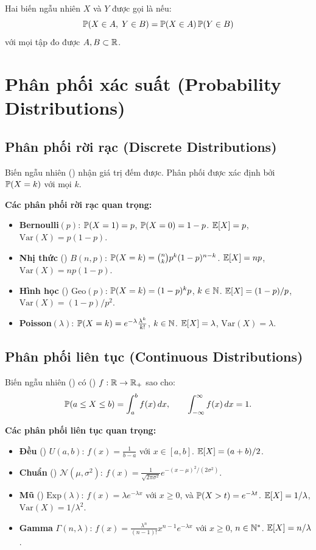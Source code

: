 Hai biến ngẫu nhiên $X$ và $Y$ được gọi là  nếu:
\[
  \mathbb{P}(X \in A,\; Y \in B) = \mathbb{P}(X \in A)\,\mathbb{P}(Y \in B)
\]
với mọi tập đo được $A, B \subset \mathbb{R}$.

\section{Phân phối xác suất (Probability Distributions)}

\subsection{Phân phối rời rạc (Discrete Distributions)}

Biến ngẫu nhiên  () nhận giá trị đếm được.
Phân phối được xác định bởi $\mathbb{P}(X = k)$ với mọi $k$.

\textbf{Các phân phối rời rạc quan trọng:}
\begin{itemize}[nosep]
  \item \textbf{Bernoulli}$(p)$: $\mathbb{P}(X = 1) = p$, $\mathbb{P}(X = 0) = 1-p$. $\mathbb{E}[X] = p$, $\text{Var}(X) = p(1-p)$.
  \item \textbf{Nhị thức} () $B(n,p)$: $\mathbb{P}(X = k) = \binom{n}{k} p^k (1-p)^{n-k}$.
    $\mathbb{E}[X] = np$, $\text{Var}(X) = np(1-p)$.
  \item \textbf{Hình học} () $\text{Geo}(p)$: $\mathbb{P}(X = k) = (1-p)^k p$, $k \in \mathbb{N}$.
    $\mathbb{E}[X] = (1-p)/p$, $\text{Var}(X) = (1-p)/p^2$.
  \item \textbf{Poisson}$(\lambda)$: $\mathbb{P}(X = k) = e^{-\lambda} \frac{\lambda^k}{k!}$, $k \in \mathbb{N}$.
    $\mathbb{E}[X] = \lambda$, $\text{Var}(X) = \lambda$.
\end{itemize}

\subsection{Phân phối liên tục (Continuous Distributions)}

Biến ngẫu nhiên  () có  () $f: \mathbb{R} \to \mathbb{R}_+$ sao cho:
\[
  \mathbb{P}(a \leq X \leq b) = \int_a^b f(x)\,dx, \qquad \int_{-\infty}^{\infty} f(x)\,dx = 1.
\]

\textbf{Các phân phối liên tục quan trọng:}
\begin{itemize}[nosep]
  \item \textbf{Đều} () $U(a,b)$:
    $f(x) = \frac{1}{b-a}$ với $x \in [a,b]$. $\mathbb{E}[X] = (a+b)/2$.
  \item \textbf{Chuẩn} () $\mathcal{N}(\mu, \sigma^2)$:
    $f(x) = \frac{1}{\sqrt{2\pi\sigma^2}} e^{-(x-\mu)^2/(2\sigma^2)}$.
  \item \textbf{Mũ} () $\text{Exp}(\lambda)$:
    $f(x) = \lambda e^{-\lambda x}$ với $x \geq 0$, và $\mathbb{P}(X > t) = e^{-\lambda t}$.
    $\mathbb{E}[X] = 1/\lambda$, $\text{Var}(X) = 1/\lambda^2$.
  \item \textbf{Gamma} $\Gamma(n, \lambda)$:
    $f(x) = \frac{\lambda^n}{(n-1)!} x^{n-1} e^{-\lambda x}$ với $x \geq 0$, $n \in \mathbb{N}^*$.
    $\mathbb{E}[X] = n/\lambda$.
\end{itemize}

